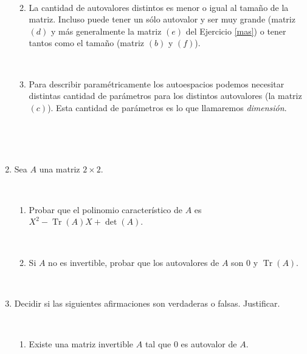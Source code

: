 \documentclass[12pt]{amsart}
\begin{document}
\begin{enumerate}
\begin{enumerate}
 \
 
 \item La cantidad de autovalores distintos es menor o igual al tama\~no de la matriz. Incluso puede tener un s\'olo autovalor y ser muy grande (matriz $(d)$ y m\'as generalmente la matriz $(e)$ del Ejercicio \eqref{mas}) o tener tantos como el tama\~no (matriz $(b)$ y $(f)$).
 
 \
 
 \item Para describir param\'etricamente los autoespacios podemos necesitar distintas cantidad de par\'ametros para los distintos autovalores (la matriz $(c)$). Esta cantidad de par\'ametros es lo que llamaremos {\it dimensi\'on}. 
\end{enumerate}


\

		

\
	
\item Sea $A$ una matriz $2\times 2$.

\

\begin{enumerate} 	
\item Probar que el polinomio caracter\'istico de $A$ es \ $X^2-\operatorname{Tr}(A)X+\det(A)$.

\

\item Si $A$ no es invertible, probar que los autovalores de  $A$ son $0$ y $\operatorname{Tr}(A)$.
\end{enumerate}

\

\item Decidir si las siguientes afirmaciones son verdaderas o falsas. Justificar.

\

\begin{enumerate}
\item Existe una matriz invertible $A$ tal que $0$ es autovalor de $A$.


\end{enumerate}
\end{enumerate}
\end{document}
